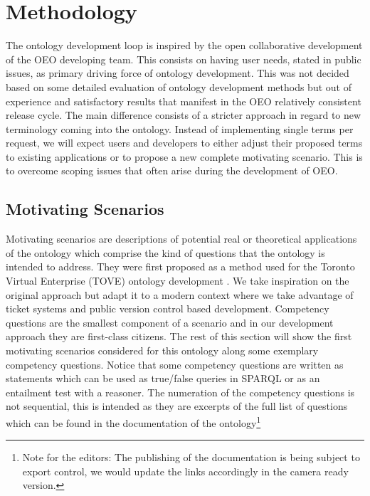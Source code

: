 ﻿\section{Methodology}
\label{methodology}

The ontology development loop is inspired by the open collaborative development
of the OEO developing team. This consists on having user needs, stated in
public issues, as primary driving force of ontology development. This was not
decided based on some detailed evaluation of ontology development methods but
out of experience and satisfactory results that manifest in the OEO relatively
consistent release cycle. The main difference consists of a stricter approach
in regard to new terminology coming into the ontology. Instead of implementing
single terms per request, we will expect users and developers to either adjust
their proposed terms to existing applications or to propose a new complete
motivating scenario. This is to overcome scoping issues that often arise during
the development of OEO. 


\subsection{Motivating Scenarios}

Motivating scenarios are descriptions of potential real or theoretical
applications of the ontology which comprise the kind of questions that the
ontology is intended to address.  They were first proposed as a method used for
the Toronto Virtual Enterprise (TOVE) ontology development
\cite{Gruninger.1995}. We take inspiration on the original approach but adapt
it to a modern context where we take advantage of ticket systems and public
version control based development. Competency questions are the smallest
component of a scenario and in our development approach they are first-class
citizens. The rest of this section will show the first motivating scenarios
considered for this ontology along some exemplary competency questions. Notice
that some competency questions are written as statements which can be used as
true/false queries in SPARQL or as an entailment test with a reasoner. The
numeration of the competency questions is not sequential, this is intended as
they are excerpts of the full list of questions which can be found in the
documentation of the ontology\footnote{Note for the editors: The publishing of
the documentation is being subject to export control, we would update the links
accordingly in the camera ready version. }

